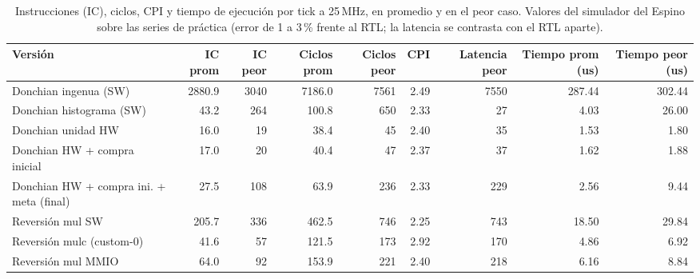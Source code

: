 \begin{table}[htbp]
\centering
\small
\begin{adjustbox}{max width=\linewidth}
\begin{tabular}{lrrrrrrrr}
\toprule
Versión & IC prom & IC peor & Ciclos prom & Ciclos peor & CPI & Latencia peor & Tiempo prom (us) & Tiempo peor (us) \\
\midrule
Donchian ingenua (SW) & 2880.9 & 3040 & 7186.0 & 7561 & 2.49 & 7550 & 287.44 & 302.44 \\
Donchian histograma (SW) & 43.2 & 264 & 100.8 & 650 & 2.33 & 27 & 4.03 & 26.00 \\
Donchian unidad HW & 16.0 & 19 & 38.4 & 45 & 2.40 & 35 & 1.53 & 1.80 \\
Donchian HW + compra inicial & 17.0 & 20 & 40.4 & 47 & 2.37 & 37 & 1.62 & 1.88 \\
Donchian HW + compra ini. + meta (final) & 27.5 & 108 & 63.9 & 236 & 2.33 & 229 & 2.56 & 9.44 \\
Reversión mul SW & 205.7 & 336 & 462.5 & 746 & 2.25 & 743 & 18.50 & 29.84 \\
Reversión mulc (custom-0) & 41.6 & 57 & 121.5 & 173 & 2.92 & 170 & 4.86 & 6.92 \\
Reversión mul MMIO & 64.0 & 92 & 153.9 & 221 & 2.40 & 218 & 6.16 & 8.84 \\
\bottomrule
\end{tabular}
\end{adjustbox}
\caption{Instrucciones (IC), ciclos, CPI y tiempo de ejecución por tick a 25\,MHz, en promedio y en el peor caso. Valores del simulador del Espino sobre las series de práctica (error de 1 a 3\,\% frente al RTL; la latencia se contrasta con el RTL aparte).}
\end{table}
